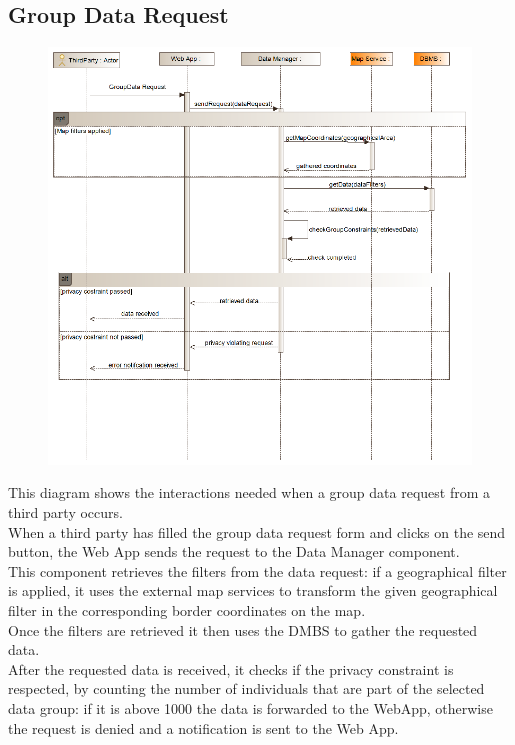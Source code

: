 \subsection{Group Data Request}
\begin{figure}[H]
\centering
\includegraphics[width=\linewidth]{resources/uml/sequence/RequestGroupData.png}
\end{figure}
This diagram shows the interactions needed when a group data request from a third party occurs.\\
When a third party has filled the group data request form and clicks on the send button, the Web App sends the request to the Data Manager component.\\
This component retrieves the filters from the data request: if a geographical filter is applied, it uses the external map services to transform the given geographical filter in the corresponding border coordinates on the map.\\
Once the filters are retrieved it then uses the DMBS to gather the requested data.\\
After the requested data is received, it checks if the privacy constraint is respected, by counting the number of individuals that are part of the selected data group: if it is above 1000 the data is forwarded to the WebApp, otherwise the request is denied and a notification is sent to the Web App.

